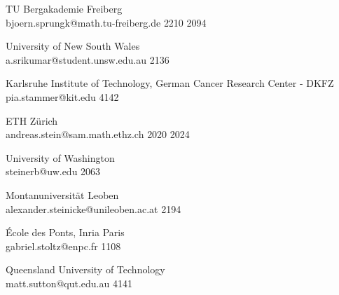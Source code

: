 \begin{multicols}{2}
 {TU Bergakademie Freiberg\\}%
 {bjoern.sprungk@math.tu-freiberg.de}%
 {2210} %
 {2094} %
 {} %
 {} %
 {} %

 {University of New South Wales\\}%
 {a.srikumar@student.unsw.edu.au}%
 {2136} %
 {} %
 {} %
 {} %
 {} %

 {Karlsruhe Institute of Technology, German Cancer Research Center - DKFZ\\}%
 {pia.stammer@kit.edu}%
 {4142} %
 {} %
 {} %
 {} %
 {} %

 {ETH Z\"{u}rich\\}%
 {andreas.stein@sam.math.ethz.ch}%
 {2020} %
 {2024} %
 {} %
 {} %
 {} %

 {University of Washington\\}%
 {steinerb@uw.edu}%
 {2063} %
 {} %
 {} %
 {} %
 {} %

 {Montanuniversit\"{a}t Leoben\\}%
 {alexander.steinicke@unileoben.ac.at}%
 {2194} %
 {} %
 {} %
 {} %
 {} %


 {\'{E}cole des Ponts, Inria Paris\\}%
 {gabriel.stoltz@enpc.fr}%
 {1108} %
 {} %
 {} %
 {} %
 {} %

 {Queensland University of Technology\\}%
 {matt.sutton@qut.edu.au}%
 {4141} %
 {} %
 {} %
 {} %
 {} %


\end{multicols}
